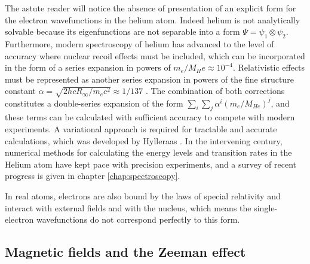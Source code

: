	The astute reader will notice the absence of presentation of an explicit form for the electron wavefunctions in the helium atom. Indeed	helium is not analytically solvable because its eigenfunctions are not separable into a form $\Psi = \psi_1\otimes\psi_2$. Furthermore, modern spectroscopy of helium has advanced to the level of accuracy where nuclear recoil effects must be included, which can be incorporated in the form of a series expansion in powers of  $m_e/M_He\approx10^{-4}$. Relativistic effects must be represented as another series expansion in powers of the fine structure constant $\alpha=\sqrt{2h c R_\infty/m_e c^2}\approx1/137$ . The combination of both corrections constitutes a double-series expansion of the form $\sum_i\sum_j \alpha^i(m_e/M_{He})^j$, and these terms can be calculated with sufficient accuracy to compete with modern experiments. A variational approach is required for tractable and accurate calculations, which was developed by Hylleraas \cite{Hylleraas1920,Hylleraas1929,Hylleraas1930}. In the intervening century, numerical methods for calculating the energy levels and transition rates in the Helium atom have kept pace with precision experiments, and a survey of recent progress is given in chapter \ref{chap:spectroscopy}.

	
	In real atoms, electrons are also bound by the laws of special relativity and interact with external fields and with the nucleus, which means the single-electron wavefunctions do not correspond perfectly to this form. 

\subsection*{Magnetic fields and the Zeeman effect}

